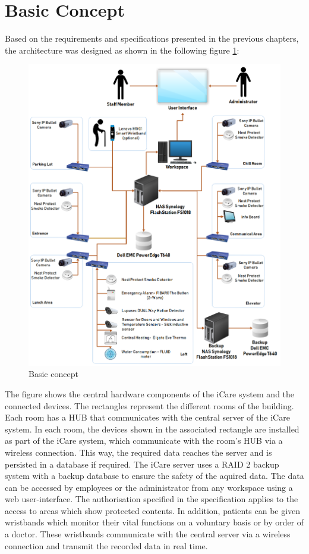 \section{Basic Concept}
Based on the requirements and specifications presented in the previous chapters, the architecture was designed as shown in the following figure \ref{architecure}:
\begin{figure}[H]
	\centering
	\includegraphics[width =1.0\textwidth]{images/architecture.PNG}
	\caption{Basic concept}
	\label{architecure}
\end{figure}
The figure shows the central hardware components of the iCare system and the connected devices. The rectangles represent the different rooms of the building. Each room has a HUB that communicates with the central server of the iCare system. In each room, the devices shown in the associated rectangle are installed as part of the iCare system, which communicate with the room's HUB via a wireless connection. This way, the required data reaches the server and is persisted in a database if required. The iCare server uses a RAID 2 backup system with a backup database to ensure the safety of the aquired data. The data can be accessed by employees or the administrator from any workspace using a web user-interface. The authorisation specified in the specification applies to the access to areas which show protected contents. In addition, patients can be given wristbands which monitor their vital functions on a voluntary basis or by order of a doctor. These wristbands communicate with the central server via a wireless connection and transmit the recorded data in real time.